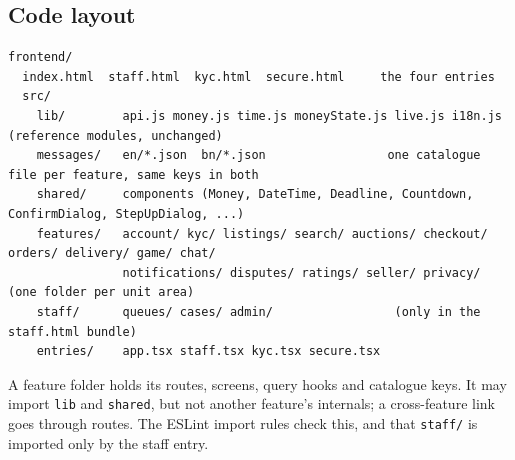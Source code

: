 \documentclass[11pt,a4paper]{article}
\begin{document}
\subsection{Code layout}
\begin{lstlisting}[language={},basicstyle=\ttfamily\scriptsize]
frontend/
  index.html  staff.html  kyc.html  secure.html     the four entries
  src/
    lib/        api.js money.js time.js moneyState.js live.js i18n.js   (reference modules, unchanged)
    messages/   en/*.json  bn/*.json                 one catalogue file per feature, same keys in both
    shared/     components (Money, DateTime, Deadline, Countdown, ConfirmDialog, StepUpDialog, ...)
    features/   account/ kyc/ listings/ search/ auctions/ checkout/ orders/ delivery/ game/ chat/
                notifications/ disputes/ ratings/ seller/ privacy/      (one folder per unit area)
    staff/      queues/ cases/ admin/                 (only in the staff.html bundle)
    entries/    app.tsx staff.tsx kyc.tsx secure.tsx
\end{lstlisting}
A feature folder holds its routes, screens, query hooks and catalogue keys. It may import \texttt{lib} and \texttt{shared}, but not another feature's internals; a cross-feature link goes through routes. The ESLint import rules check this, and that \texttt{staff/} is imported only by the staff entry.
\end{document}
